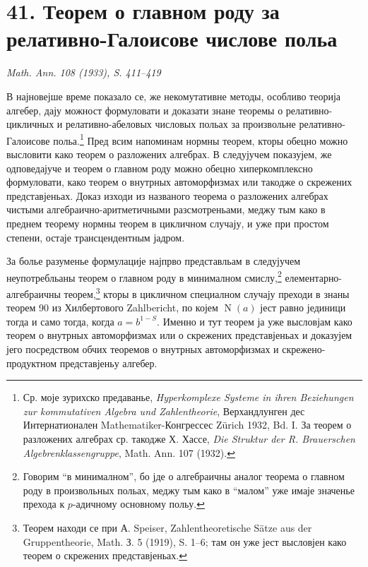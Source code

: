 ﻿\documentclass[11pt]{article}
\newcommand{\foreign}[1]{#1}
\providecommand{\Norm}{\operatorname{N}}
\begin{document}
\section*{41. Теорем о главном роду за релативно-Галоисове числове польа}

\begin{center}
\emph{\foreign{Math. Ann. 108 (1933), S. 411--419}}
\end{center}

В најновејше време показало се, же некомутативне методы, особливо теорија алгебер, дају можност формуловати и доказати знане теоремы о релативно-цикличных и релативно-абеловых числовых польах за произвольне релативно-Галоисове польа.\footnote{Ср. моје зурихско предаванье, \foreign{\emph{Hyperkomplexe Systeme in ihren Beziehungen zur kommutativen Algebra und Zahlentheorie}}, Верхандлунген дес Интернатионален Mathematiker-Конгрессес Zürich 1932, Bd. I. За теорем о разложених алгебрах ср. такодже Х. Хассе, \foreign{\emph{Die Struktur der R. Brauerschen Algebrenklassengruppe}}, Math. Ann. 107 (1932).} Пред всим напоминам нормны теорем, кторы обецно можно высловити како теорем о разложених алгебрах. В следујучем показујем, же одповедајуче и теорем о главном роду можно обецно хиперкомплексно формуловати, како теорем о внутрных автоморфизмах или такодже о скрежених представјеньах. Доказ изходи из названого теорема о разложених алгебрах чистыми алгебраично-аритметичными разсмотреньами, меджу тым како в преднем теорему нормны теорем в цикличном случају, и уже при простом степени, остаје трансцендентным јадром.

За болье разуменье формулације најпрво представльам в следујучем неупотребльаны теорем о главном роду в минималном смислу,\footnote{Говорим ``в минималном'', бо јде о алгебраичны аналог теорема о главном роду в произвольных польах, меджу тым како в ``малом'' уже имаје значенье прехода к \(p\)-адичному основному польу.} елементарно-алгебраичны теорем,\footnote{Теорем находи се при А. Speiser, \foreign{Zahlentheoretische Sätze aus der Gruppentheorie}, Math. З. 5 (1919), S. 1--6; там он уже јест высловјен како теорем о скрежених представјеньах.} кторы в цикличном специалном случају преходи в знаны теорем 90 из Хилбертового \foreign{Zahlbericht}, по којем \(\Norm(a)\) јест равно јединици тогда и само тогда, когда \(a=b^{1-S}\). Именно и тут теорем ја уже высловјам како теорем о внутрных автоморфизмах или о скрежених представјеньах и доказујем јего посредством обчих теоремов о внутрных автоморфизмах и скрежено-продуктном представјеньу алгебер.
\end{document}
